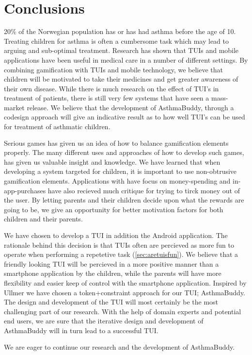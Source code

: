 \chapter{Conclusions}
\label{conclusions}

20\% of the Norwegian population has or has had asthma before the age of 10. Treating children for asthma is often a cumbersome task which may lead to arguing and sub-optimal treatment. Research has shown that TUIs and mobile applications have been useful in medical care in a number of different settings. By combining gamification with TUIs and mobile technology, we believe that children will be motivated to take their medicines and get greater awareness of their own disease. While there is much research on the effect of TUI's in treatment of patients, there is still very few systems that have seen a mass-market release. We believe that the development of AsthmaBuddy, through a codesign approach will give an indicative result as to how well TUI's can be used for treatment of asthmatic children.


Serious games has given us an idea of how to balance gamification elements properly. The many different uses and approaches of how to develop such games, has given us valuable insight and knowledge. We have learned that when developing a system targeted for children, it is important to use non-obtrusive gamification elements. Applications with have focus on money-spending and in-app-purchases have also recieved much critique for trying to tirck money out of the user. By letting parents and their children decide upon what the rewards are going to be, we give an opportunity for better motivation factors for both children and their parents. 


We have chosen to develop a TUI in addition the Android application. The rationale behind this decision is that TUIs often are percieved as more fun to operate when performing a repetetive task (\ref{sec:aretuisfun}). We believe that a friendly looking TUI will be percieved in a more positive manner than a smartphone application by the children, while the parents will have more flexibility and easier keep of control with the smartphone application. Inspired by Ullmer \cite{ullmer2002tangible} we have chosen a token+constraint approach for our TUI; AsthmaBuddy. The design and development of the TUI will most certainly be the most challenging part of our research. With the help of domain experts and potential end users, we are sure that the iterative design and development of AsthmaBuddy will in turn lead to a successful TUI. 

We are eager to continue our research and the development of AsthmaBuddy. 


